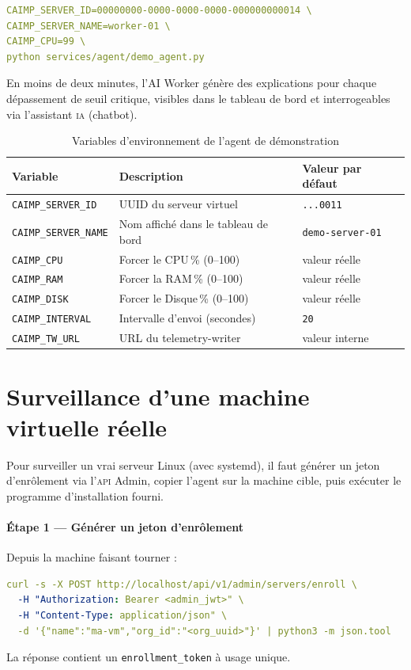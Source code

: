 \begin{lstlisting}[language=YAML, caption={Terminal 3 — worker-01 avec CPU critique}]
CAIMP_SERVER_ID=00000000-0000-0000-0000-000000000014 \
CAIMP_SERVER_NAME=worker-01 \
CAIMP_CPU=99 \
python services/agent/demo_agent.py
\end{lstlisting}

\noindent En moins de deux minutes, l'AI Worker génère des explications pour
chaque dépassement de seuil critique, visibles dans le tableau de bord et
interrogeables via l'assistant \textsc{ia} (chatbot).

\begin{table}[H]
\centering
\caption{Variables d'environnement de l'agent de démonstration}
\label{tab:demo-agent-vars}
\small
\begin{tabularx}{\textwidth}{lXl}
\toprule
\textbf{Variable} & \textbf{Description} & \textbf{Valeur par défaut} \\
\midrule
\texttt{CAIMP\_SERVER\_ID}   & UUID du serveur virtuel            & \texttt{...0011} \\
\texttt{CAIMP\_SERVER\_NAME} & Nom affiché dans le tableau de bord & \texttt{demo-server-01} \\
\texttt{CAIMP\_CPU}          & Forcer le CPU\,\% (0--100)         & valeur réelle \\
\texttt{CAIMP\_RAM}          & Forcer la RAM\,\% (0--100)         & valeur réelle \\
\texttt{CAIMP\_DISK}         & Forcer le Disque\,\% (0--100)      & valeur réelle \\
\texttt{CAIMP\_INTERVAL}     & Intervalle d'envoi (secondes)      & \texttt{20} \\
\texttt{CAIMP\_TW\_URL}      & URL du telemetry-writer            & valeur interne \\
\bottomrule
\end{tabularx}
\end{table}

\section{Surveillance d'une machine virtuelle réelle}
\label{sec:surveillance-vm}

Pour surveiller un vrai serveur Linux (avec systemd), il faut générer un jeton
d'enrôlement via l'\textsc{api} Admin, copier l'agent sur la machine cible,
puis exécuter le programme d'installation fourni.

\paragraph{Étape 1 — Générer un jeton d'enrôlement}
Depuis la machine faisant tourner \caimp{} :
\begin{lstlisting}[language=YAML]
curl -s -X POST http://localhost/api/v1/admin/servers/enroll \
  -H "Authorization: Bearer <admin_jwt>" \
  -H "Content-Type: application/json" \
  -d '{"name":"ma-vm","org_id":"<org_uuid>"}' | python3 -m json.tool
\end{lstlisting}
La réponse contient un \texttt{enrollment\_token} à usage unique.


